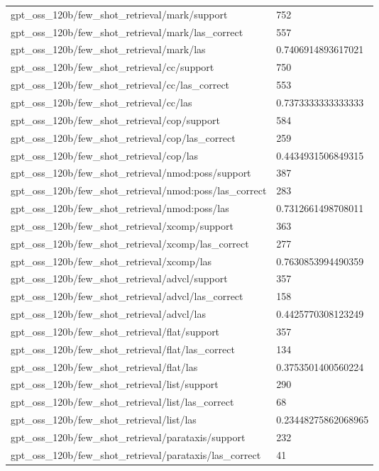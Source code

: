 \begin{tabular}{ll}
gpt\_oss\_120b/few\_shot\_retrieval/mark/support & 752 \\
gpt\_oss\_120b/few\_shot\_retrieval/mark/las\_correct & 557 \\
gpt\_oss\_120b/few\_shot\_retrieval/mark/las & 0.7406914893617021 \\
gpt\_oss\_120b/few\_shot\_retrieval/cc/support & 750 \\
gpt\_oss\_120b/few\_shot\_retrieval/cc/las\_correct & 553 \\
gpt\_oss\_120b/few\_shot\_retrieval/cc/las & 0.7373333333333333 \\
gpt\_oss\_120b/few\_shot\_retrieval/cop/support & 584 \\
gpt\_oss\_120b/few\_shot\_retrieval/cop/las\_correct & 259 \\
gpt\_oss\_120b/few\_shot\_retrieval/cop/las & 0.4434931506849315 \\
gpt\_oss\_120b/few\_shot\_retrieval/nmod:poss/support & 387 \\
gpt\_oss\_120b/few\_shot\_retrieval/nmod:poss/las\_correct & 283 \\
gpt\_oss\_120b/few\_shot\_retrieval/nmod:poss/las & 0.7312661498708011 \\
gpt\_oss\_120b/few\_shot\_retrieval/xcomp/support & 363 \\
gpt\_oss\_120b/few\_shot\_retrieval/xcomp/las\_correct & 277 \\
gpt\_oss\_120b/few\_shot\_retrieval/xcomp/las & 0.7630853994490359 \\
gpt\_oss\_120b/few\_shot\_retrieval/advcl/support & 357 \\
gpt\_oss\_120b/few\_shot\_retrieval/advcl/las\_correct & 158 \\
gpt\_oss\_120b/few\_shot\_retrieval/advcl/las & 0.4425770308123249 \\
gpt\_oss\_120b/few\_shot\_retrieval/flat/support & 357 \\
gpt\_oss\_120b/few\_shot\_retrieval/flat/las\_correct & 134 \\
gpt\_oss\_120b/few\_shot\_retrieval/flat/las & 0.3753501400560224 \\
gpt\_oss\_120b/few\_shot\_retrieval/list/support & 290 \\
gpt\_oss\_120b/few\_shot\_retrieval/list/las\_correct & 68 \\
gpt\_oss\_120b/few\_shot\_retrieval/list/las & 0.23448275862068965 \\
gpt\_oss\_120b/few\_shot\_retrieval/parataxis/support & 232 \\
gpt\_oss\_120b/few\_shot\_retrieval/parataxis/las\_correct & 41 \\

\end{tabular}
